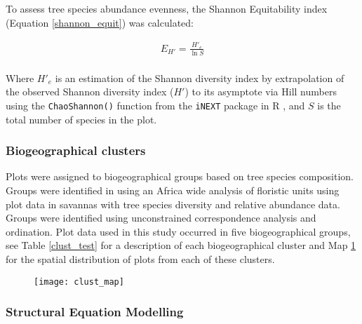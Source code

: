 \documentclass[11pt,a4paper]{article}
\begin{document}
To assess tree species abundance evenness, the Shannon Equitability index \citep{} (Equation \ref{shannon_equit}) was calculated: 

\begin{equation}
	\begin{gathered}
		E_{H'} = \frac{H'_{e}}{\ln{S}} \\
	\end{gathered}
	\label{shannon_equit}
\end{equation}

Where $H'_{e}$ is an estimation of the Shannon diversity index by extrapolation of the observed Shannon diversity index ($H'$) to its asymptote via Hill numbers using the \verb|ChaoShannon()| function from the \verb|iNEXT| package in R \citep{Hsieh2016}, and $S$ is the total number of species in the plot.

\subsubsection{Biogeographical clusters}

Plots were assigned to biogeographical groups based on tree species composition. Groups were identified in \citet{Fayolle2018} using an Africa wide analysis of floristic units using plot data in savannas with tree species diversity and relative abundance data. Groups were identified using unconstrained correspondence analysis and ordination. Plot data used in this study occurred in five biogeographical groups, see Table \ref{clust_test} for a description of each biogeographical cluster and Map \ref{clust_map} for the spatial distribution of plots from each of these clusters.



\begin{figure}[H]
\centering
	\texttt{[image: clust\_map]}
	\caption{}
	\label{clust_map}
\end{figure}

\subsubsection{Structural Equation Modelling}
\end{document}
